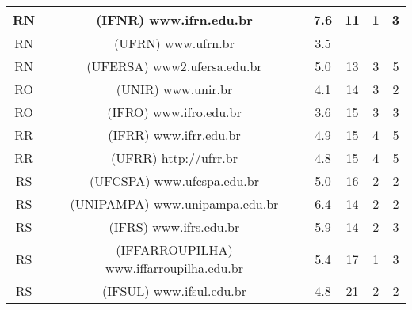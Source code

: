 \begin{center}
\begin{longtable}{|c|l|l|l|l|l|}
\hline
\multicolumn{1}{|c|}{RN} & \multicolumn{1}{c|}{(IFNR) www.ifrn.edu.br} & \multicolumn{1}{c|}{7.6} & \multicolumn{1}{c|}{11} & \multicolumn{1}{c|}{1} & \multicolumn{1}{c|}{3} \\ 
\hline
\multicolumn{1}{|c|}{RN} & \multicolumn{1}{c|}{(UFRN) www.ufrn.br} & \multicolumn{1}{c|}{3.5} & \multicolumn{1}{c|}{} & \multicolumn{1}{c|}{} & \multicolumn{1}{c|}{} \\ 
\hline
\multicolumn{1}{|c|}{RN} & \multicolumn{1}{c|}{(UFERSA) www2.ufersa.edu.br} & \multicolumn{1}{c|}{5.0} & \multicolumn{1}{c|}{13} & \multicolumn{1}{c|}{3} & \multicolumn{1}{c|}{5} \\ 
\hline
\multicolumn{1}{|c|}{RO} & \multicolumn{1}{c|}{(UNIR) www.unir.br} & \multicolumn{1}{c|}{4.1} & \multicolumn{1}{c|}{14} & \multicolumn{1}{c|}{3} & \multicolumn{1}{c|}{2} \\ 
\hline
\multicolumn{1}{|c|}{RO} & \multicolumn{1}{c|}{(IFRO) www.ifro.edu.br} & \multicolumn{1}{c|}{3.6} & \multicolumn{1}{c|}{15} & \multicolumn{1}{c|}{3} & \multicolumn{1}{c|}{3} \\ 
\hline
\multicolumn{1}{|c|}{RR} & \multicolumn{1}{c|}{(IFRR) www.ifrr.edu.br} & \multicolumn{1}{c|}{4.9} & \multicolumn{1}{c|}{15} & \multicolumn{1}{c|}{4} & \multicolumn{1}{c|}{5} \\ 
\hline
\multicolumn{1}{|c|}{RR} & \multicolumn{1}{c|}{(UFRR) http://ufrr.br} & \multicolumn{1}{c|}{4.8} & \multicolumn{1}{c|}{15} & \multicolumn{1}{c|}{4} & \multicolumn{1}{c|}{5} \\ 
\hline
\multicolumn{1}{|c|}{RS} & \multicolumn{1}{c|}{(UFCSPA) www.ufcspa.edu.br} & \multicolumn{1}{c|}{5.0} & \multicolumn{1}{c|}{16} & \multicolumn{1}{c|}{2} & \multicolumn{1}{c|}{2} \\ 
\hline
\multicolumn{1}{|c|}{RS} & \multicolumn{1}{c|}{(UNIPAMPA) www.unipampa.edu.br} & \multicolumn{1}{c|}{6.4} & \multicolumn{1}{c|}{14} & \multicolumn{1}{c|}{2} & \multicolumn{1}{c|}{2} \\ 
\hline
\multicolumn{1}{|c|}{RS} & \multicolumn{1}{c|}{(IFRS) www.ifrs.edu.br} & \multicolumn{1}{c|}{5.9} & \multicolumn{1}{c|}{14} & \multicolumn{1}{c|}{2} & \multicolumn{1}{c|}{3} \\ 
\hline
\multicolumn{1}{|c|}{RS} & \multicolumn{1}{c|}{(IFFARROUPILHA) www.iffarroupilha.edu.br} & \multicolumn{1}{c|}{5.4} & \multicolumn{1}{c|}{17} & \multicolumn{1}{c|}{1} & \multicolumn{1}{c|}{3} \\ 
\hline
\multicolumn{1}{|c|}{RS} & \multicolumn{1}{c|}{(IFSUL) www.ifsul.edu.br} & \multicolumn{1}{c|}{4.8} & \multicolumn{1}{c|}{21} & \multicolumn{1}{c|}{2} & \multicolumn{1}{c|}{2} \\ 

\end{longtable}
\end{center}
